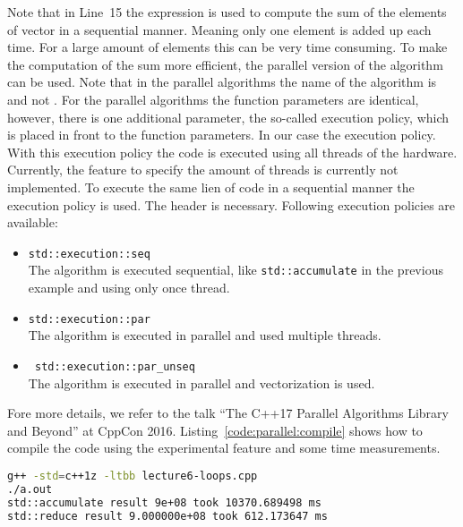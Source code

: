 Note that in Line~15 the expression  is used to compute the sum of the elements of vector  in a sequential manner. Meaning only one element is added up each time. For a large amount of elements this can be very time consuming. To make the computation of the sum more efficient, the parallel version of the algorithm can be used. Note that in the parallel algorithms the name of the algorithm is  and not . For the parallel algorithms the function parameters are identical, however, there is one additional parameter, the so-called execution policy, which is placed in front to the function parameters. In our case the  execution policy. With this execution policy the code is executed using all threads of the hardware. Currently, the feature to specify the amount of threads is currently not implemented. To execute the same lien of code in a sequential manner the execution policy  is used. The header  is necessary. Following execution policies are available:
\begin{itemize}
\item \lstinline|std::execution::seq| \\
The algorithm is executed sequential, like \lstinline|std::accumulate| in the previous example and using only once thread.
\item \lstinline|std::execution::par| \\
The algorithm is executed in parallel and used multiple threads.
\item \lstinline| std::execution::par_unseq| \\
The algorithm is executed in parallel and vectorization is used.
\end{itemize}
Fore more details, we refer to the talk ``The C++17 Parallel Algorithms Library and
Beyond'' at CppCon 2016. Listing~\ref{code:parallel:compile} shows how to compile the code using the experimental feature and some time measurements.





\begin{lstlisting}[language=bash,caption={Compilation of the parallel algorithm example.\label{code:parallel:compile}},float,floatplacement=tb]
g++ -std=c++1z -ltbb lecture6-loops.cpp 
./a.out
std::accumulate result 9e+08 took 10370.689498 ms
std::reduce result 9.000000e+08 took 612.173647 ms
\end{lstlisting}


\newpage
\printendnotes
